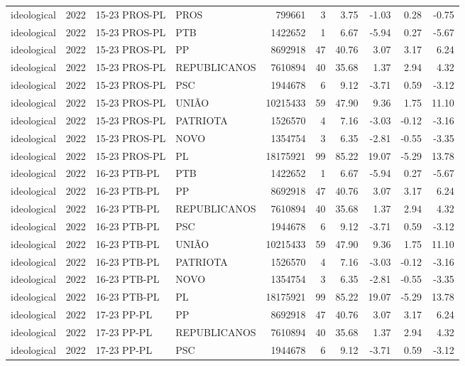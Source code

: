 \begin{landscape}
\begin{longtable}{lllL{2.8cm}rrrrrr}
ideological & 2022 & 15-23 PROS-PL & PROS & 799661 & 3 & 3.75 & -1.03 & 0.28 & -0.75 \\
ideological & 2022 & 15-23 PROS-PL & PTB & 1422652 & 1 & 6.67 & -5.94 & 0.27 & -5.67 \\
ideological & 2022 & 15-23 PROS-PL & PP & 8692918 & 47 & 40.76 & 3.07 & 3.17 & 6.24 \\
ideological & 2022 & 15-23 PROS-PL & REPUBLICANOS & 7610894 & 40 & 35.68 & 1.37 & 2.94 & 4.32 \\
ideological & 2022 & 15-23 PROS-PL & PSC & 1944678 & 6 & 9.12 & -3.71 & 0.59 & -3.12 \\
ideological & 2022 & 15-23 PROS-PL & UNIÃO & 10215433 & 59 & 47.90 & 9.36 & 1.75 & 11.10 \\
ideological & 2022 & 15-23 PROS-PL & PATRIOTA & 1526570 & 4 & 7.16 & -3.03 & -0.12 & -3.16 \\
ideological & 2022 & 15-23 PROS-PL & NOVO & 1354754 & 3 & 6.35 & -2.81 & -0.55 & -3.35 \\
ideological & 2022 & 15-23 PROS-PL & PL & 18175921 & 99 & 85.22 & 19.07 & -5.29 & 13.78 \\
ideological & 2022 & 16-23 PTB-PL & PTB & 1422652 & 1 & 6.67 & -5.94 & 0.27 & -5.67 \\
ideological & 2022 & 16-23 PTB-PL & PP & 8692918 & 47 & 40.76 & 3.07 & 3.17 & 6.24 \\
ideological & 2022 & 16-23 PTB-PL & REPUBLICANOS & 7610894 & 40 & 35.68 & 1.37 & 2.94 & 4.32 \\
ideological & 2022 & 16-23 PTB-PL & PSC & 1944678 & 6 & 9.12 & -3.71 & 0.59 & -3.12 \\
ideological & 2022 & 16-23 PTB-PL & UNIÃO & 10215433 & 59 & 47.90 & 9.36 & 1.75 & 11.10 \\
ideological & 2022 & 16-23 PTB-PL & PATRIOTA & 1526570 & 4 & 7.16 & -3.03 & -0.12 & -3.16 \\
ideological & 2022 & 16-23 PTB-PL & NOVO & 1354754 & 3 & 6.35 & -2.81 & -0.55 & -3.35 \\
ideological & 2022 & 16-23 PTB-PL & PL & 18175921 & 99 & 85.22 & 19.07 & -5.29 & 13.78 \\
ideological & 2022 & 17-23 PP-PL & PP & 8692918 & 47 & 40.76 & 3.07 & 3.17 & 6.24 \\
ideological & 2022 & 17-23 PP-PL & REPUBLICANOS & 7610894 & 40 & 35.68 & 1.37 & 2.94 & 4.32 \\
ideological & 2022 & 17-23 PP-PL & PSC & 1944678 & 6 & 9.12 & -3.71 & 0.59 & -3.12 \\

\end{longtable}
\end{landscape}
